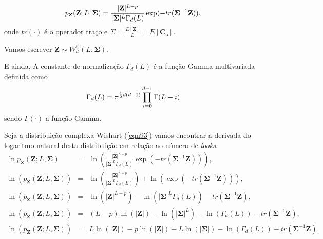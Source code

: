 \documentclass[12pt,a4paper]{article}
\begin{document}
\begin{equation}\label{eqn93}
	p_{\mathbf{Z}}(\mathbf{Z};L,\mathbf{\Sigma})=\frac{|\mathbf{Z}|^{L-p}}{|\mathbf{\Sigma}|^{L}\Gamma_d(L)} \exp(-tr(\mathbf{\Sigma}^{-1}\mathbf{Z})), \\
\end{equation}
onde $tr(\cdot)$ é o operador traço e ${\Sigma}=\frac{E[\mathbf{Z}]}{L}=E[\mathbf{C_{s}}]$. 

Vamos escrever $\mathbf{Z}\sim W_d^{\mathbb C}(L, \mathbf{\Sigma})$.

E ainda, A constante de normalização $\Gamma_d(L)$ é a função Gamma multivariada definida como 
\begin{equation}\label{eqn94}
	\Gamma_d(L)=\pi^{\frac{1}{2}d(d-1)} \prod_{i=0}^{d-1}\Gamma(L-i) \\
\end{equation}
sendo $\Gamma(\cdot)$ a função Gamma.

Seja a distribuição complexa Wishart (\ref{eqn93}) vamos encontrar a derivada do logaritmo natural desta distribuição em relação ao número de {\it looks}.
\begin{equation}\label{eqn95}
\begin{array}{ccc}
	\ln{p_{\mathbf{Z}}(\mathbf{Z};L,\mathbf{\Sigma})}&=&\ln{\left(\frac{|\mathbf{Z}|^{L-p}}{|\mathbf{\Sigma}|^{L}\Gamma_d(L)} \exp(-tr(\mathbf{\Sigma}^{-1}\mathbf{Z}))\right)}, \\
	\ln{\left(p_{\mathbf{Z}}(\mathbf{Z};L,\mathbf{\Sigma})\right)}&=&\ln{\left(\frac{|\mathbf{Z}|^{L-p}}{|\mathbf{\Sigma}|^{L}\Gamma_d(L)}\right)}+\ln{\left( \exp(-tr(\mathbf{\Sigma}^{-1}\mathbf{Z}))\right)}, \\
	\ln{\left(p_{\mathbf{Z}}(\mathbf{Z};L,\mathbf{\Sigma})\right)}&=&\ln{\left(|\mathbf{Z}|^{L-p}\right)} - \ln{\left(|\mathbf{\Sigma}|^{L}\Gamma_d(L)\right)}-tr(\mathbf{\Sigma}^{-1}\mathbf{Z}), \\
	\ln{\left(p_{\mathbf{Z}}(\mathbf{Z};L,\mathbf{\Sigma})\right)}&=&(L-p)\ln{\left(|\mathbf{Z}|\right)} - \ln{\left(|\mathbf{\Sigma}|^{L}\right)}-\ln{\left(\Gamma_d(L)\right)}-tr(\mathbf{\Sigma}^{-1}\mathbf {Z}), \\
	\ln{\left(p_{\mathbf{Z}}(\mathbf{Z};L,\mathbf{\Sigma})\right)}&=&L\ln{\left(|\mathbf{Z}|\right)}-p\ln{\left(|\mathbf{Z}|\right)} - L\ln{\left(|\mathbf{\Sigma}|\right)}-\ln{\left(\Gamma_d(L)\right)}-tr(\mathbf{\Sigma}^{-1}\mathbf{Z}). \\
\end{array}
\end{equation}
\end{document}

